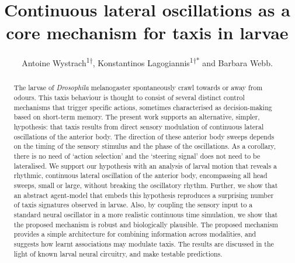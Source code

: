 \documentclass[11pt,a4paper]{article}
\author{Antoine Wystrach\textsuperscript{1†}, Konstantinos Lagogiannis\textsuperscript{1†*} and Barbara Webb.}
\title{Continuous lateral oscillations as a core mechanism for taxis in \Dros larvae}
\newcommand{\Dros }{\emph{Drosophila }}
\begin{document}
\linenumbers

\listoftodos

\maketitle

\begin{abstract}
The larvae of \Dros melanogaster spontaneously crawl towards or away from odours. This taxis behaviour is thought to consist of several distinct control mechanisms that trigger specific actions, sometimes characterised as decision-making based on short-term memory.
 The present work supports an alternative, simpler, hypothesis: that taxis results from direct sensory modulation of continuous lateral oscillations of the anterior body. The direction of these anterior body sweeps depends on the timing of the sensory stimulus and the phase of the oscillations. As a corollary, there is no need of ‘action selection’ and the `steering signal' does not need to be lateralised. 
We support our hypothesis with an analysis of larval motion that reveals a rhythmic, continuous lateral oscillation of the anterior body, encompassing all head sweeps, small or large, without breaking the oscillatory rhythm.
Further, we show that an abstract agent-model that embeds this hypothesis reproduces a surprising number of taxis signatures observed in larvae. 
Also, by coupling the sensory input to a standard neural oscillator in a more realistic continuous time simulation, we show that the proposed mechanism is robust and biologically plausible. 
The proposed mechanism provides a simple architecture for combining information across modalities, and suggests how learnt associations may modulate taxis. The results are discussed in the light of known larval neural circuitry, and make testable predictions.
\end{abstract}

\end{document}
